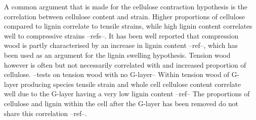 A common argument that is made for the cellulose contraction hypothesis is the
correlation between cellulose content and strain. Higher proportions of
cellulose compared to lignin correlate to tensile strains, while high lignin
content correlates well to compressive strains --refs--. It has been well
reported that compression wood is partly characterised by an increase in
lignin content --ref--, which has been used as an argument for the lignin
swelling hypothesis. Tension wood however is often but not necessarily
correlated with and increased proportion of cellulose. --tests on tension wood
with no G-layer-- Within tension wood of G-layer producing species tensile
strain and whole cell cellulose content correlate well due to the G-layer
having a very low lignin content --ref-- The proportions of cellulose and lignin
within the cell after the G-layer has been removed do not share this correlation
--ref--.
